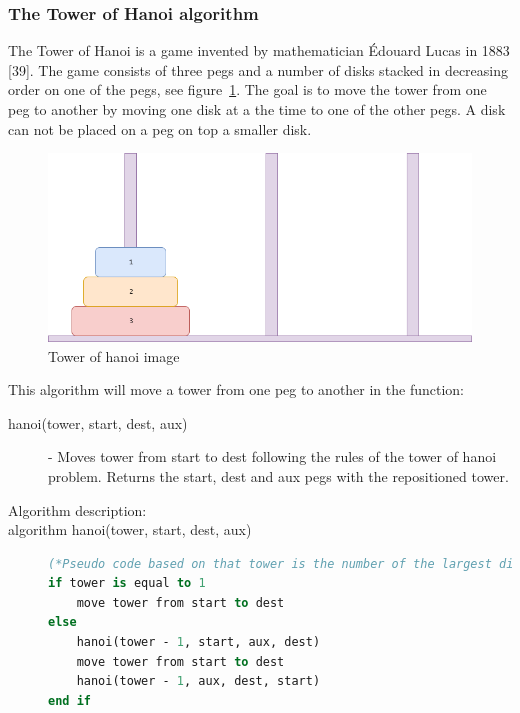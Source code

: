 \documentclass {article}
\begin{document}
\subsubsection{The Tower of Hanoi algorithm}
The Tower of Hanoi is a game invented by mathematician Édouard Lucas in 1883 [39]. The game consists of three pegs and a number of disks stacked in decreasing order on one of the pegs, see figure~\ref{fig:tower-of-hanoi-example}. The goal is to move the tower from one peg to another by moving one disk at a the time to one of the other pegs. A disk can not be placed on a peg on top a smaller disk. 

\begin{figure}[H]
\includegraphics[width=\textwidth]{tower-of-hanoi-example}

\caption{Tower of hanoi image}
\label{fig:tower-of-hanoi-example}
\end{figure}

This algorithm will move a tower from one peg to another in the function:

\begin{description}
\item[hanoi(tower, start, dest, aux)] - Moves tower from start to dest following the rules of the tower of hanoi problem. Returns the start, dest and aux pegs with the repositioned tower.


\item[Algorithm description:]
\item[algorithm hanoi(tower, start, dest, aux)]
\item[] 
\begin{lstlisting}[language=Pascal]
(*Pseudo code based on that tower is the number of the largest disk, where 1 is the smallest disk in the tower.*)
if tower is equal to 1
 	move tower from start to dest
else
 	hanoi(tower - 1, start, aux, dest)
 	move tower from start to dest
 	hanoi(tower - 1, aux, dest, start)
end if
\end{lstlisting}
\end{description}
\end{document}

